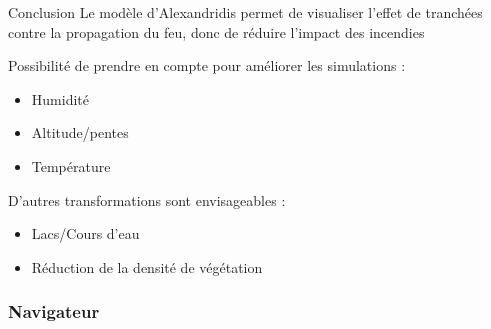 \documentclass{beamer}
\begin{document}
\begin{frame}{Conclusion \hyperlink{jump}{\beamerbutton{ }} \hypertarget{18}{\beamerbutton{ }}}
    Le modèle d'Alexandridis permet de visualiser l'effet de tranchées contre la propagation du feu, donc de réduire l'impact des incendies
    
    Possibilité de prendre en compte pour améliorer les simulations :
    \begin{itemize}
        \item Humidité
        \item Altitude/pentes
        \item Température
    \end{itemize}

    D'autres transformations sont envisageables :
    \begin{itemize}
        \item Lacs/Cours d'eau
        \item Réduction de la densité de végétation
    \end{itemize}
\end{frame}

\begin{frame}
    \frametitle{Navigateur \hypertarget{jump}{\beamerbutton{ }}}
    
    \hyperlink{1}{} \\
    \hyperlink{2}{} \\
    \hyperlink{3}{} \\
    \hyperlink{4}{} \\
    \hyperlink{5}{} \\
    \hyperlink{6}{} \\
    \hyperlink{7}{} \\
    \hyperlink{8}{} \\
    \hyperlink{9}{} \\
    \hyperlink{10}{} \\
    \hyperlink{11}{} \\
    \hyperlink{12}{} \\
    \hyperlink{13}{} \\
    \hyperlink{14}{} \\
    \hyperlink{15}{} \\
    \hyperlink{16}{} \\
    \hyperlink{17}{} \\
    \hyperlink{17}{}
\end{frame}
\end{document}
